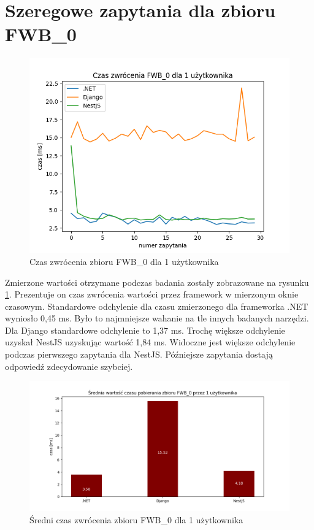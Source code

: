 \section{Szeregowe zapytania dla zbioru FWB\_0}

\begin{figure}[!hb]
	\centering \includegraphics[width=1\linewidth]{rysunki/Czas_zwrocenia_FWB_0_dla_1_uzytkownika.png}
	\caption{Czas zwrócenia zbioru FWB\_0 dla 1 użytkownika}
	\label{rys:request_duration_for_FWB_0}
\end{figure}

Zmierzone wartości otrzymane podczas badania zostały zobrazowane na rysunku \ref{rys:request_duration_for_FWB_0}.
Prezentuje on czas zwrócenia wartości przez framework w mierzonym oknie czasowym.
Standardowe odchylenie dla czasu zmierzonego dla frameworka .NET wyniosło 0,45 ms.
Było to najmniejsze wahanie na tle innych badanych narzędzi.
Dla Django standardowe odchylenie to 1,37 ms.
Trochę większe odchylenie uzyskał NestJS uzyskując wartość 1,84 ms.
Widoczne jest większe odchylenie podczas pierwszego zapytania dla NestJS.
Późniejsze zapytania dostają odpowiedź zdecydowanie szybciej.

\begin{figure}[!hb]
	\centering \includegraphics[width=1\linewidth]{rysunki/Srednia_wartosc_czasu_pobierania_zbioru_FWB_0_przez_1_uzytkownika.png}
	\caption{Średni czas zwrócenia zbioru FWB\_0 dla 1 użytkownika}
	\label{rys:mean_duration_for_FWB_0}
\end{figure}

